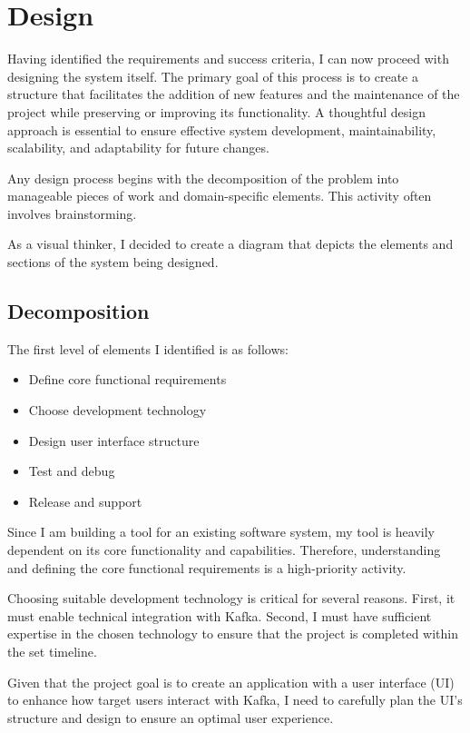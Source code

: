 \documentclass[10pt , a4paper]{report}
\begin{document}
\chapter{Design}

Having identified the requirements and success criteria, I can now proceed with designing the system itself. The primary goal of this process is to create a structure that facilitates the addition of new features and the maintenance of the project while preserving or improving its functionality. A thoughtful design approach is essential to ensure effective system development, maintainability, scalability, and adaptability for future changes.

Any design process begins with the decomposition of the problem into manageable pieces of work and domain-specific elements. This activity often involves brainstorming.

As a visual thinker, I decided to create a diagram that depicts the elements and sections of the system being designed.

\section{Decomposition}

The first level of elements I identified is as follows:
\begin{itemize}
    \item Define core functional requirements
    \item Choose development technology
    \item Design user interface structure
    \item Test and debug
    \item Release and support
\end{itemize}

Since I am building a tool for an existing software system, my tool is heavily dependent on its core functionality and capabilities. Therefore, understanding and defining the core functional requirements is a high-priority activity.

Choosing suitable development technology is critical for several reasons. First, it must enable technical integration with Kafka. Second, I must have sufficient expertise in the chosen technology to ensure that the project is completed within the set timeline.

Given that the project goal is to create an application with a user interface (UI) to enhance how target users interact with Kafka, I need to carefully plan the UI's structure and design to ensure an optimal user experience.
\end{document}

